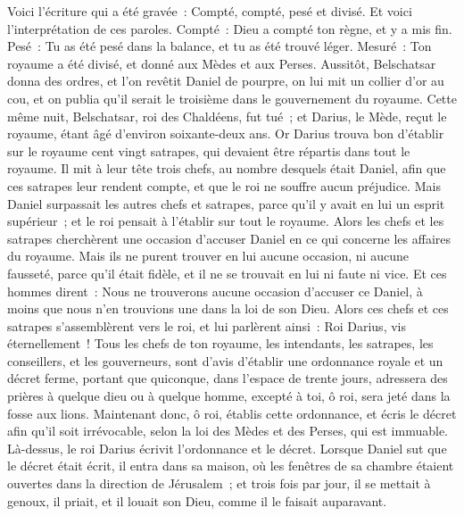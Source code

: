 \begin{multicols}{2}
Voici l'écriture qui a été gravée~: Compté, compté, pesé et divisé.
Et voici l'interprétation de ces paroles. Compté~: Dieu a compté ton règne, et y a mis fin.
Pesé~: Tu as été pesé dans la balance, et tu as été trouvé léger.
Mesuré~: Ton royaume a été divisé, et donné aux Mèdes et aux Perses.
Aussitôt, Belschatsar donna des ordres, et l'on revêtit Daniel de pourpre, on lui mit un collier d'or au cou, et on publia qu'il serait le troisième dans le gouvernement du royaume.
Cette même nuit, Belschatsar, roi des Chaldéens, fut tué~;
et Darius, le Mède, reçut le royaume, étant âgé d'environ soixante-deux ans.
\VerseOne{}Or Darius trouva bon d'établir sur le royaume cent vingt satrapes, qui devaient être répartis dans tout le royaume.
Il mit à leur tête trois chefs, au nombre desquels était Daniel, afin que ces satrapes leur rendent compte, et que le roi ne souffre aucun préjudice.
Mais Daniel surpassait les autres chefs et satrapes, parce qu'il y avait en lui un esprit supérieur~; et le roi pensait à l'établir sur tout le royaume.
Alors les chefs et les satrapes cherchèrent une occasion d'accuser Daniel en ce qui concerne les affaires du royaume. Mais ils ne purent trouver en lui aucune occasion, ni aucune fausseté, parce qu'il était fidèle, et il ne se trouvait en lui ni faute ni vice.
Et ces hommes dirent~: Nous ne trouverons aucune occasion d'accuser ce Daniel, à moins que nous n'en trouvions une dans la loi de son Dieu.
Alors ces chefs et ces satrapes s'assemblèrent vers le roi, et lui parlèrent ainsi~: Roi Darius, vis éternellement~!
Tous les chefs de ton royaume, les intendants, les satrapes, les conseillers, et les gouverneurs, sont d'avis d'établir une ordonnance royale et un décret ferme, portant que quiconque, dans l'espace de trente jours, adressera des prières à quelque dieu ou à quelque homme, excepté à toi, ô roi, sera jeté dans la fosse aux lions.
Maintenant donc, ô roi, établis cette ordonnance, et écris le décret afin qu'il soit irrévocable, selon la loi des Mèdes et des Perses, qui est immuable.
Là-dessus, le roi Darius écrivit l'ordonnance et le décret.
Lorsque Daniel sut que le décret était écrit, il entra dans sa maison, où les fenêtres de sa chambre étaient ouvertes dans la direction de Jérusalem~; et trois fois par jour, il se mettait à genoux, il priait, et il louait son Dieu, comme il le faisait auparavant.

\end{multicols}
